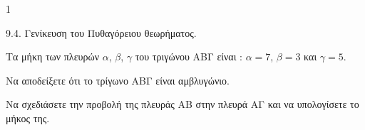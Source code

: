 \begin{ylh}{1}
    \item 9.4. Γενίκευση του Πυθαγόρειου θεωρήματος.
\end{ylh}
Τα μήκη των πλευρών $\alpha$, $\beta$, $\gamma$ του τριγώνου ΑΒΓ είναι : $\alpha=7$, $\beta=3$ και $\gamma=5$.
\begin{alist}
\item Να αποδείξετε ότι το τρίγωνο ΑΒΓ είναι αμβλυγώνιο. 
\item Να σχεδιάσετε την προβολή της πλευράς ΑΒ στην πλευρά ΑΓ και να υπολογίσετε το μήκος της. 
\end{alist}